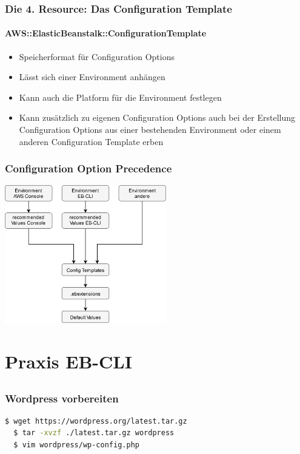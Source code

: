 \documentclass[aspectratio=169,grey,smaller]{beamer}
\begin{document}
\begin{frame}
  \frametitle{Die 4. Resource: Das Configuration Template}
  \framesubtitle{AWS::ElasticBeanstalk::ConfigurationTemplate}
  \begin{itemize}
  \item Speicherformat für Configuration Options
  \item<2-> Lässt sich einer Environment anhängen
  \item<3-> Kann auch die Platform für die Environment festlegen
  \item<4-> Kann zusätzlich zu eigenen Configuration Options auch bei der Erstellung Configuration Options aus einer bestehenden Environment oder einem anderen Configuration Template erben
  \end{itemize}
\end{frame}

\begin{frame}
  \frametitle{Configuration Option Precedence}
  \begin{center}
  \includegraphics[height=6cm]{precedence}
  \end{center}
\end{frame}

\section{Praxis EB-CLI}
\subsection{}

\begin{frame}[fragile]
  \frametitle{Wordpress vorbereiten}
  \begin{lstlisting}[language=Bash]
  $ wget https://wordpress.org/latest.tar.gz
  $ tar -xvzf ./latest.tar.gz wordpress
  $ vim wordpress/wp-config.php
  \end{lstlisting}
\end{frame}
\end{document}
